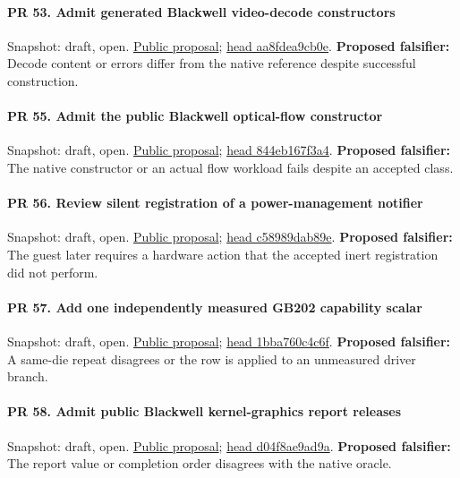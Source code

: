 \paragraph{PR 53. Admit generated Blackwell video-decode constructors}
\readcode Snapshot: draft, open.
\href{\repobase/pull/53}{Public proposal};
\href{\repobase/commit/aa8fdea9cb0e00fd4e5ec148461d1e805d308e0c}{head aa8fdea9cb0e}.
\textbf{Proposed falsifier:} Decode content or errors differ from the native reference despite
  successful construction.

\paragraph{PR 55. Admit the public Blackwell optical-flow constructor}
\readcode Snapshot: draft, open.
\href{\repobase/pull/55}{Public proposal};
\href{\repobase/commit/844eb167f3a4a5b86e6b001e62ba3f6f7078402b}{head 844eb167f3a4}.
\textbf{Proposed falsifier:} The native constructor or an actual flow workload fails despite an
  accepted class.

\paragraph{PR 56. Review silent registration of a power-management notifier}
\readcode Snapshot: draft, open.
\href{\repobase/pull/56}{Public proposal};
\href{\repobase/commit/c58989dab89e8e033efc9ab807a29771b3d0006c}{head c58989dab89e}.
\textbf{Proposed falsifier:} The guest later requires a hardware action that the accepted inert
  registration did not perform.

\paragraph{PR 57. Add one independently measured GB202 capability scalar}
\readcode Snapshot: draft, open.
\href{\repobase/pull/57}{Public proposal};
\href{\repobase/commit/1bba760c4c6f0d32cb48f9e11a13ccc663786300}{head 1bba760c4c6f}.
\textbf{Proposed falsifier:} A same-die repeat disagrees or the row is applied to an unmeasured
  driver branch.

\paragraph{PR 58. Admit public Blackwell kernel-graphics report releases}
\readcode Snapshot: draft, open.
\href{\repobase/pull/58}{Public proposal};
\href{\repobase/commit/d04f8ae9ad9a6169da7bb2de68bbf0f63d4c6778}{head d04f8ae9ad9a}.
\textbf{Proposed falsifier:} The report value or completion order disagrees with the native oracle.

